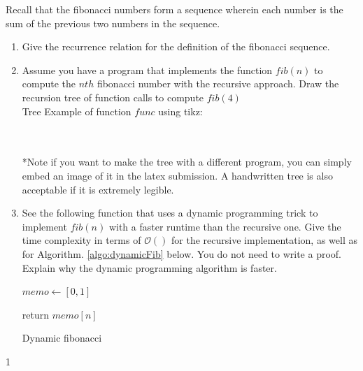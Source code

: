 \documentclass[9pt]{article}
\def\solutions{1}
\newcommand{\ben}{\begin{enumerate}}
\newcommand{\een}{\end{enumerate}}
\begin{document}
Recall that the fibonacci numbers form a sequence wherein each number is the sum of the previous two numbers in the sequence.

\ben
  \item

  Give the recurrence relation for the definition of the fibonacci sequence.

  \item

  Assume you have a program that implements the function $fib(n)$ to compute the $nth$ fibonacci number with the recursive approach. Draw the recursion tree of function calls to compute $fib(4)$ \\

  Tree Example of function $func$ using tikz: \\
   \\\\
  *Note if you want to make the tree with a different program, you can simply embed an image of it in the latex submission. A handwritten tree is also acceptable if it is extremely legible.

  \item See the following function that uses a dynamic programming trick to implement $fib(n)$ with a faster runtime than the recursive one. Give the time complexity in terms of $\mathcal{O}()$ for the recursive implementation, as well as for Algorithm. \ref{algo:dynamicFib} below. You do not need to write a proof. Explain why the dynamic programming algorithm is faster.

  \begin{center}
  \begin{algorithm}
     {
      {$memo \gets [0,1]$}\;

      return $memo[n]$
    }
    \caption{Dynamic fibonacci}
    \label{algo:dynamicFib}
  \end{algorithm}
  \end{center}

\een

\if\solutions1
 \vspace{2mm}
\end{document}
